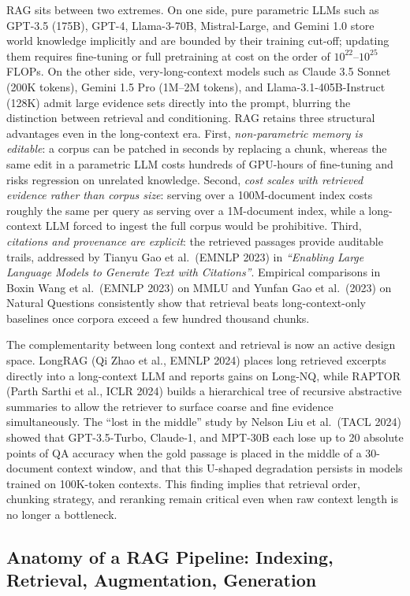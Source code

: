 RAG sits between two extremes. On one side, pure parametric LLMs such as GPT-3.5 (175B), GPT-4, Llama-3-70B, Mistral-Large, and Gemini 1.0 store world knowledge implicitly and are bounded by their training cut-off; updating them requires fine-tuning or full pretraining at cost on the order of \(10^{22}\)--\(10^{25}\) FLOPs. On the other side, very-long-context models such as Claude 3.5 Sonnet (200K tokens), Gemini 1.5 Pro (1M--2M tokens), and Llama-3.1-405B-Instruct (128K) admit large evidence sets directly into the prompt, blurring the distinction between retrieval and conditioning. RAG retains three structural advantages even in the long-context era. First, \emph{non-parametric memory is editable}: a corpus can be patched in seconds by replacing a chunk, whereas the same edit in a parametric LLM costs hundreds of GPU-hours of fine-tuning and risks regression on unrelated knowledge. Second, \emph{cost scales with retrieved evidence rather than corpus size}: serving over a 100M-document index costs roughly the same per query as serving over a 1M-document index, while a long-context LLM forced to ingest the full corpus would be prohibitive. Third, \emph{citations and provenance are explicit}: the retrieved passages provide auditable trails, addressed by Tianyu Gao et al.~(EMNLP 2023) in \emph{``Enabling Large Language Models to Generate Text with Citations''}. Empirical comparisons in Boxin Wang et al.~(EMNLP 2023) on MMLU and Yunfan Gao et al.~(2023) on Natural Questions consistently show that retrieval beats long-context-only baselines once corpora exceed a few hundred thousand chunks.

The complementarity between long context and retrieval is now an active design space. LongRAG (Qi Zhao et al., EMNLP 2024) places long retrieved excerpts directly into a long-context LLM and reports gains on Long-NQ, while RAPTOR (Parth Sarthi et al., ICLR 2024) builds a hierarchical tree of recursive abstractive summaries to allow the retriever to surface coarse and fine evidence simultaneously. The ``lost in the middle'' study by Nelson Liu et al.~(TACL 2024) showed that GPT-3.5-Turbo, Claude-1, and MPT-30B each lose up to 20 absolute points of QA accuracy when the gold passage is placed in the middle of a 30-document context window, and that this U-shaped degradation persists in models trained on 100K-token contexts. This finding implies that retrieval order, chunking strategy, and reranking remain critical even when raw context length is no longer a bottleneck.

\subsection{Anatomy of a RAG Pipeline: Indexing, Retrieval, Augmentation, Generation}\label{anatomy-of-a-rag-pipeline-indexing-retrieval-augmentation-generation}

